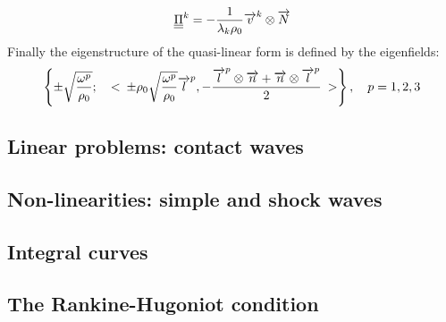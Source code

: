 \begin{equation}
  \label{eq:stress_left_eigen}
  {\underline{\underline{\Pi}}}^k = -\frac{1}{\lambda_k\rho_0}{\overrightarrow{v}}^k\otimes{\overrightarrow{N}}
\end{equation}
Finally the eigenstructure of the quasi-linear form is defined by the eigenfields:
\begin{equation}
  \label{eq:HE_eigenfields}
    \left\lbrace \pm \sqrt{\frac{\omega^p}{\rho_0}} ; \quad <\: \pm \rho_0\sqrt{\frac{\omega^p}{\rho_0}} {\overrightarrow{l}}^p , -\frac{{\overrightarrow{l}}^p\otimes {\overrightarrow{n}}+{\overrightarrow{n}}\otimes {\overrightarrow{l}}^p}{2} \:>  \right\rbrace ,\quad p=1,2,3
\end{equation}
\subsection{Linear problems: contact waves}
\subsection{Non-linearities: simple and shock waves}
\subsection{Integral curves}
\subsection{The Rankine-Hugoniot condition}


